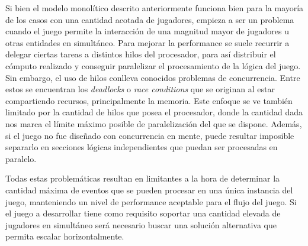
\noindent Si bien el modelo monolítico descrito anteriormente funciona bien para la mayoría de los 
casos con una cantidad acotada de jugadores, empieza a ser un problema cuando el juego 
permite la interacción de una magnitud mayor de jugadores u otras entidades en simultáneo. 
Para mejorar la performance se suele recurrir a delegar ciertas tareas a distintos hilos del procesador, para así distribuir 
el cómputo realizado y conseguir paralelizar el procesamiento de la lógica del juego. 
Sin embargo, el uso de hilos conlleva conocidos problemas de concurrencia. Entre estos se encuentran los \textit{deadlocks} o \textit{race conditions} que se originan al estar compartiendo 
recursos, principalmente la memoria. Este enfoque se ve también limitado por la cantidad de hilos 
que posea el procesador, donde la cantidad dada nos marca el límite máximo posible de paralelización
del que se dispone. Además, si el juego no fue diseñado con concurrencia en mente, puede resultar imposible separarlo en secciones lógicas
independientes que puedan ser procesadas en paralelo.

Todas estas problemáticas resultan en limitantes a la hora de determinar la cantidad máxima de eventos
que se pueden procesar en una única instancia del juego, manteniendo un nivel de performance aceptable para el flujo del juego.
Si el juego a desarrollar tiene como requisito soportar una cantidad elevada de jugadores
en simultáneo será necesario buscar una solución alternativa que permita escalar horizontalmente.
